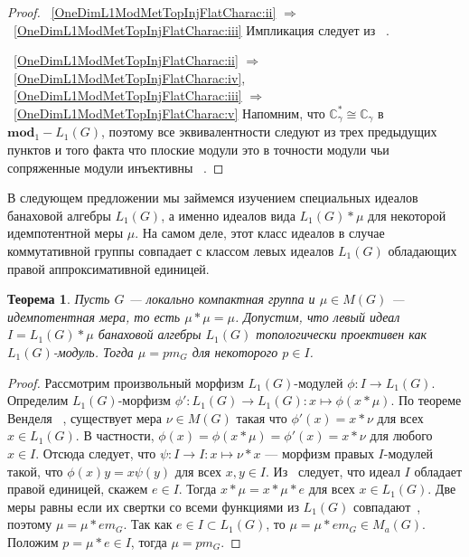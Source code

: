 \documentclass{article}
\numberwithin{equation}{section}
\theoremstyle{plain}
\newtheorem{theorem}{Теорема}
\theoremstyle{definition}
\newtheorem{proof}{Доказательство}\def\theproof{}
\newcommand{\convol}{\ast}
\newcommand{\isom}{\mathop{\mathbin{\cong}}}
\begin{document}
\begin{fulltext}
\begin{proof}
~\ref{OneDimL1ModMetTopInjFlatCharac:ii} $\Longrightarrow$
~\ref{OneDimL1ModMetTopInjFlatCharac:iii} Импликация следует из
~\cite[предложение~2.14]{NemGeomProjInjFlatBanMod}.

~\ref{OneDimL1ModMetTopInjFlatCharac:ii} $\Longrightarrow$
~\ref{OneDimL1ModMetTopInjFlatCharac:iv},
~\ref{OneDimL1ModMetTopInjFlatCharac:iii} $\Longrightarrow$
~\ref{OneDimL1ModMetTopInjFlatCharac:v} Напомним, что $\mathbb{C}_\gamma^*\isom
\mathbb{C}_\gamma$ в $\mathbf{mod}_1-L_1(G)$, поэтому все эквивалентности
следуют из трех предыдущих пунктов и того факта что плоские модули это в
точности модули чьи сопряженные модули инъективны
~\cite[предложение~2.21]{NemGeomProjInjFlatBanMod}.
\end{proof}

В следующем предложении мы займемся изучением специальных идеалов банаховой
алгебры $L_1(G)$, а именно идеалов вида $L_1(G)\convol\mu$ для некоторой
идемпотентной меры $\mu$. На самом деле, этот класс идеалов в случае
коммутативной группы совпадает с классом левых идеалов $L_1(G)$ обладающих
правой аппроксимативной единицей.

\begin{theorem}\label{CommIdealByIdemMeasL1MetTopProjCharac} Пусть $G$ ---
локально компактная группа и $\mu\in M(G)$ --- идемпотентная мера, то есть
$\mu\convol\mu=\mu$. Допустим, что левый идеал $I=L_1(G)\convol\mu$ банаховой
алгебры $L_1(G)$ топологически проективен как $L_1(G)$-модуль. Тогда $\mu=p m_G$
для некоторого $p\in I$.
\end{theorem}
\begin{proof} Рассмотрим произвольный морфизм $L_1(G)$-модулей $\phi:I\to
L_1(G)$. Определим $L_1(G)$-морфизм $\phi':L_1(G)\to
L_1(G):x\mapsto\phi(x\convol\mu)$. По теореме Венделя
~\cite[теорема~1]{WendLeftCentrzrs}, существует мера $\nu\in M(G)$ такая что
$\phi'(x)=x\convol\nu$ для всех $x\in L_1(G)$. В частности,
$\phi(x)=\phi(x\convol\mu)=\phi'(x)=x\convol\nu$ для любого $x\in I$. Отсюда
следует, что $\psi:I\to I:x\mapsto\nu\convol x$ --- морфизм правых $I$-модулей
такой, что $\phi(x)y=x\psi(y)$ для всех $x,y\in I$. Из~\cite[лемма~2,
пункт~\textup{(ii)}]{NemMetTopProjIdBanAlg} следует, что идеал $I$ обладает
правой единицей, скажем $e\in I$. Тогда $x\convol\mu=x\convol\mu\convol e$ для
всех $x\in L_1(G)$. Две меры равны если их свертки со всеми функциями из
$L_1(G)$ совпадают~\cite[следствие~3.3.24]{DalBanAlgAutCont}, поэтому
$\mu=\mu\convol e m_G$. Так как $e\in I\subset L_1(G)$, то $\mu=\mu\convol e
m_G\in M_a(G)$. Положим $p=\mu\convol e\in I$, тогда $\mu=p m_G$.
\end{proof}


\end{fulltext}
\end{document}
